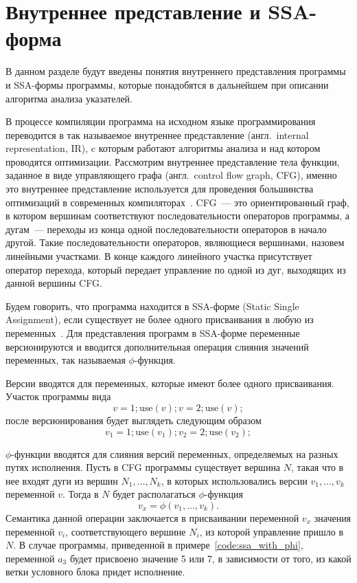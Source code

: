 \documentclass[14pt,titlepage]{extarticle}
\let\oldphi\phi
\renewcommand{\phi}{\ensuremath{\oldphi}}
\newcommand{\eng}[1]{{\English#1}}
\newcommand{\engdef}[1]{(англ.~\eng{#1})}
\let\oldsection\section
\renewcommand{\section}{\newpage\oldsection}
\begin{document}
  \section{Внутреннее представление и SSA-форма}
    \label{section:ir_and_ssa}

    В данном разделе будут введены понятия внутреннего представления программы
    и SSA-формы программы, которые понадобятся в дальнейшем при описании
    алгоритма анализа указателей.

    В процессе компиляции программа на исходном языке программирования
    переводится в так называемое внутреннее представление
    \engdef{internal representation, IR}, c которым работают
    алгоритмы анализа и над котором проводятся оптимизации.
    Рассмотрим внутреннее представление тела функции, заданное в виде
    управляющего графа \engdef{control flow graph, CFG}, именно это
    внутреннее представление используется для проведения большинства
    оптимизаций в современных компиляторах~\cite{muchnick}.
    CFG~--- это ориентированный граф, в котором вершинам соответствуют
    последовательности операторов программы, а дугам~--- переходы из конца
    одной последовательности операторов в начало другой. Такие
    последовательности операторов, являющиеся вершинами, назовем линейными
    участками. В конце каждого линейного участка присутствует оператор
    перехода, который передает управление по одной из дуг, выходящих из
    данной вершины CFG.

    Будем говорить, что программа находится в SSA-форме (\eng{Static Single
    Assignment}), если существует не более одного присваивания в любую из
    переменных~\cite{ssa}.
    Для представления программ в SSA-форме переменные версионируются и
    вводится дополнительная операция слияния значений переменных, так
    называемая \phi-функция.

    Версии вводятся для переменных, которые имеют более одного присваивания.
    Участок программы вида
    \[ v = 1; \textrm{use}(v); v = 2; \textrm{use}(v); \]
    после версионирования будет выглядеть следующим образом
    \[ v_1 = 1; \textrm{use}(v_1); v_2 = 2; \textrm{use}(v_2); \]

    \phi-функции вводятся для слияния версий переменных, определяемых
    на разных путях исполнения. Пусть в CFG программы существует
    вершина $N$, такая что в нее входят дуги из вершин $N_1, \ldots, N_k$, в
    которых использовались версии $v_1, \ldots, v_k$ переменной $v$. Тогда в
    $N$ будет располагаться \phi-функция
    \[ v_x = \phi(v_1, \ldots, v_k). \]
    Семантика данной операции заключается в присваивании переменной $v_x$
    значения переменной $v_i$, соответствующего вершине $N_i$, из которой
    управление пришло в $N$. В случае программы, приведенной в
    примере~\ref{code:ssa_with_phi}, переменной $a_3$ будет присвоено значение
    5 или 7, в зависимости от того, из какой ветки условного блока придет
    исполнение.
\end{document}

